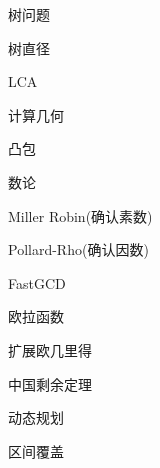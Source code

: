 \documentclass{article}
\begin{document}
\begin{enumerate}
{\bf \LARGE \item 树问题}
	
	\begin{itemize}
	
	{\bf \item 树直径}
	

	{\bf \item LCA}
	
	
	
	\end{itemize}
	
{\bf \LARGE \item 计算几何}

	\begin{itemize}
	
	{\bf \item 凸包}
		
	
	\end{itemize}

{\bf \LARGE \item 数论}

	\begin{itemize}
	
	{\bf \item Miller Robin(确认素数)}
		
	
	{\bf \item Pollard-Rho(确认因数)}	
	
	
	{\bf \item FastGCD}
	
	
	{\bf \item 欧拉函数}
	
	
	{\bf \item 扩展欧几里得}
	
	
	{\bf \item 中国剩余定理}
	
	
	\end{itemize}

{\bf \LARGE \item  动态规划}

	\begin{itemize}
	
	{\bf \item 区间覆盖}
		
	

\end{itemize}
\end{enumerate}
\end{document}
